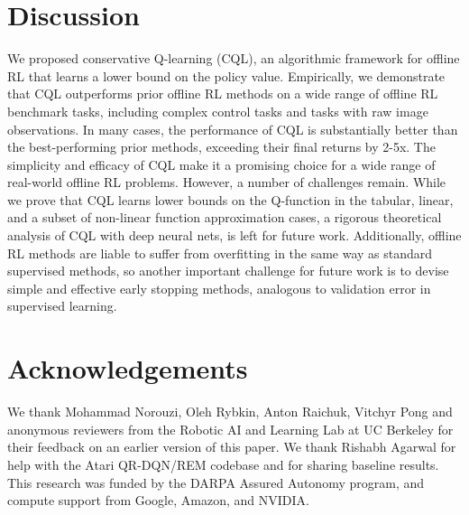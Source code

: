 \documentclass{article}
\begin{document}
\section{Discussion}
\vspace{-5pt}
We proposed conservative Q-learning (CQL), an algorithmic framework for offline RL that learns a lower bound on the policy value.
Empirically, we demonstrate that CQL outperforms prior offline RL methods on a wide range of offline RL benchmark tasks, including complex control tasks and tasks with raw image observations. In many cases, the performance of CQL is substantially better than the best-performing prior methods, exceeding their final returns by 2-5x.
The simplicity and efficacy of CQL make it a promising choice for a wide range of real-world offline RL problems. However, a number of challenges remain. While we prove that CQL learns lower bounds on the Q-function in the tabular, linear, and a subset of non-linear function approximation cases, a rigorous theoretical analysis of CQL with deep neural nets, is left for future work. Additionally, offline RL methods are liable to suffer from overfitting in the same way as standard supervised methods, so another important challenge for future work is to devise simple and effective early stopping methods, analogous to validation error in supervised learning.


\section*{Acknowledgements}
We thank Mohammad Norouzi, Oleh Rybkin, Anton Raichuk, Vitchyr Pong and anonymous reviewers from the Robotic AI and Learning Lab at UC Berkeley for their feedback on an earlier version of this paper. We thank Rishabh Agarwal for help with the Atari QR-DQN/REM codebase and for sharing baseline results. This research was funded by the DARPA Assured Autonomy program, and compute support from Google, Amazon, and NVIDIA.






\newpage
\appendix

\end{document}
